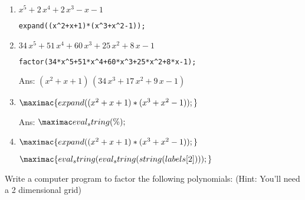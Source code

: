 \begin{enumerate}[resume]
\item $x^5+2\,x^4+2\,x^3-x-1$

\lstinline!expand((x^2+x+1)*(x^3+x^2-1));!

\item $34\,x^5+51\,x^4+60\,x^3+25\,x^2+8\,x-1$

\lstinline!factor(34*x^5+51*x^4+60*x^3+25*x^2+8*x-1);!

Ans: $\left(x^2+x+1\right)\,\left(34\,x^3+17\,x^2+9\,x-1\right)$


\item $$




\textcolor{blue}{}

Ans: $$

\item $$




$$





\end{enumerate}

Write a computer program to factor the following polynomials:\hfil\break
\-\hspace{1cm} (Hint: You'll need a 2 dimensional grid)

